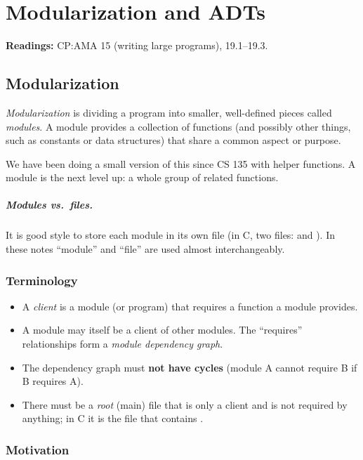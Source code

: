 \chapter{Modularization and ADTs}

\textbf{Readings:} CP:AMA 15 (writing large programs), 19.1--19.3.

\section{Modularization}

\begin{definition}
\emph{Modularization} is dividing a program into smaller, well-defined pieces called
\emph{modules}. A module provides a collection of functions (and possibly other things, such as
constants or data structures) that share a common aspect or purpose.
\end{definition}

We have been doing a small version of this since CS 135 with helper functions. A module is the
next level up: a whole group of related functions.

\paragraph{Modules vs.\ files.} It is good style to store each module in its own file
(in C, two files:  and ). In these notes ``module'' and ``file'' are used
almost interchangeably.

\subsection{Terminology}

\begin{itemize}
  \item A \emph{client} is a module (or program) that requires a function a module provides.
  \item A module may itself be a client of other modules. The ``requires'' relationships form a
    \emph{module dependency graph}.
  \item The dependency graph must \textbf{not have cycles} (module A cannot require B if B
    requires A).
  \item There must be a \emph{root} (main) file that is only a client and is not required by
    anything; in C it is the file that contains .
\end{itemize}

\subsection{Motivation}


